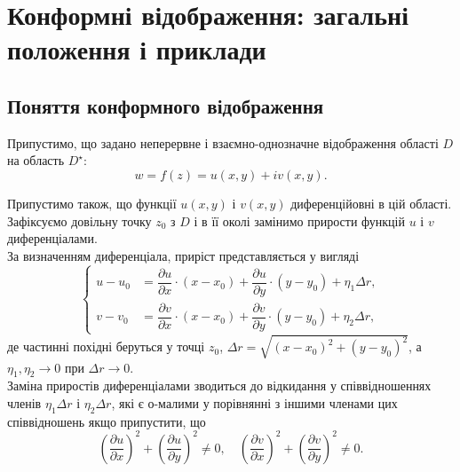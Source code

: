 \section{Конформні відображення: загальні положення і приклади}

\subsection{Поняття конформного відображення}

Припустимо, що задано неперервне і взаємно-однозначне відображення області $D$ на область $D^\star$:
\begin{equation}
    \label{eq:27.1}
    w = f(z) = u(x, y) + i v(x, y).
\end{equation}

Припустимо також, що функції $u(x, y)$ і $v(x, y)$ диференційовні в цій області. \\

Зафіксуємо довільну точку $z_0$ з $D$ і в її околі замінимо прирости функцій $u$ і $v$ диференціалами. \\

За визначенням диференціала, приріст представляється у вигляді
\begin{equation}
    \label{eq:27.2}
    \left\{
        \begin{aligned}
            u - u_0 &= \dfrac{\partial u}{\partial x} \cdot (x - x_0) + \dfrac{\partial u}{\partial y} \cdot (y - y_0) + \eta_1 \Delta r, \\
            v - v_0 &= \dfrac{\partial v}{\partial x} \cdot (x - x_0) + \dfrac{\partial v}{\partial y} \cdot (y - y_0) + \eta_2 \Delta r,
        \end{aligned}
    \right.
\end{equation}
де частинні похідні беруться у точці $z_0$, $\Delta r = \sqrt{(x - x_0)^2 + (y - y_0)^2}$, а $\eta_1, \eta_2 \to 0$ при $\Delta r \to 0$. \\

Заміна приростів диференціалами зводиться до відкидання у співвідношеннях  членів $\eta_1 \Delta r$ і $\eta_2 \Delta r$, які є о-малими у порівнянні з іншими членами цих співвідношень якщо припустити, що 
\begin{equation*}
    \left( \dfrac{\partial u}{\partial x} \right)^2 + \left( \dfrac{\partial u}{\partial y} \right)^2 \ne 0, \quad \left( \dfrac{\partial v}{\partial x} \right)^2 + \left( \dfrac{\partial v}{\partial y} \right)^2 \ne 0.
\end{equation*}

